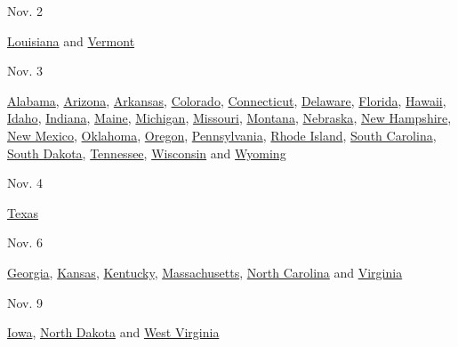 Nov. 2

\href{https://www.sos.la.gov/electionsandvoting/Pages/default.aspx}{Louisiana}
and \href{https://sos.vermont.gov/elections/}{Vermont}

Nov. 3

\href{https://www.sos.alabama.gov/alabama-votes/voter/absentee-voting}{Alabama},
\href{https://azsos.gov/votebymail}{Arizona},
\href{https://www.sos.arkansas.gov/elections}{Arkansas},
\href{https://www.sos.state.co.us/pubs/elections/main.html}{Colorado},
\href{https://portal.ct.gov/SOTS/Common-Elements/V5-Template---Redesign/Elections--Voting--Home-Page}{Connecticut},
\href{https://elections.delaware.gov/index.shtml}{Delaware},
\href{https://dos.myflorida.com/elections/}{Florida},
\href{http://hawaii.gov/elections}{Hawaii},
\href{https://sos.idaho.gov/elections-division/}{Idaho},
\href{https://www.in.gov/sos/elections/}{Indiana},
\href{https://www.maine.gov/sos/cec/elec/}{Maine},
\href{https://www.michigan.gov/sos/0,4670,7-127-1633---,00.html}{Michigan},
\href{https://www.sos.mo.gov/elections}{Missouri},
\href{https://sosmt.gov/elections/}{Montana},
\href{https://www.nebraska.gov/featured/elections-voting/}{Nebraska},
\href{https://sos.nh.gov/Elections.aspx}{New Hampshire},
\href{https://www.sos.state.nm.us/voting-and-elections/voter-information-portal/absentee-and-early-voting/}{New
Mexico}, \href{https://www.ok.gov/elections/}{Oklahoma},
\href{https://sos.oregon.gov/voting-elections/Pages/default.aspx}{Oregon},
\href{https://www.dos.pa.gov/VotingElections/Pages/default.aspx}{Pennsylvania},
\href{https://vote.sos.ri.gov/}{Rhode Island},
\href{https://www.scvotes.org/}{South Carolina},
\href{https://sdsos.gov/elections-voting/default.aspx}{South Dakota},
\href{https://sos.tn.gov/elections}{Tennessee},
\href{https://elections.wi.gov/}{Wisconsin} and
\href{https://soswy.state.wy.us/elections}{Wyoming}

Nov. 4

\href{https://www.sos.state.tx.us/elections/index.shtml}{Texas}

Nov. 6

\href{https://sos.ga.gov/index.php/?section=elections}{Georgia},
\href{https://sos.kansas.gov/elections/}{Kansas},
\href{https://elect.ky.gov/Pages/default.aspx}{Kentucky},
\href{https://www.sec.state.ma.us/ele/eleidx.htm}{Massachusetts},
\href{https://www.ncsbe.gov/voting/vote-mail}{North Carolina} and
\href{https://www.elections.virginia.gov/}{Virginia}

Nov. 9

\href{https://sos.iowa.gov/elections/voterinformation/index.html}{Iowa},
\href{https://vip.sos.nd.gov/PortalList.aspx}{North Dakota} and
\href{https://sos.wv.gov/elections/Pages/default.aspx}{West Virginia}

